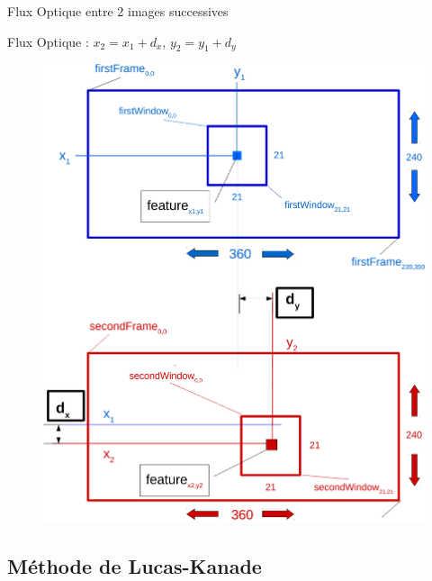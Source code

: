 \documentclass{bredelebeamer}
\begin{document}
\begin{frame}{Flux Optique entre 2 images successives}

\end{frame}


\begin{frame}{Flux Optique : $x_{2}=x_{1}+d_{x}$, $y_{2}=y_{1}+d_{y}$}

\begin{figure}
\includegraphics[scale=0.3]{images/framesWindow.pdf}
\end{figure}

\end{frame}



\subsection{Méthode de Lucas-Kanade}
\end{document}
